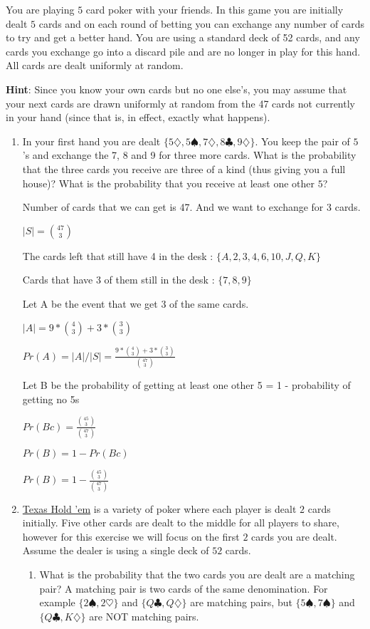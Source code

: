 \documentclass[12pt]{article}
\newcounter{ques}
\newenvironment{question}{\stepcounter{ques}{\noindent\bf Question \arabic{ques}:}}{\vspace{5mm}}
\begin{document}
\begin{question}
	You are playing $5$ card poker with your friends. In this game you are initially dealt $5$ cards and on each round of betting you can exchange any number of cards to try and get a better hand. You are using a standard deck of 52 cards, and any cards you exchange go into a discard pile and are no longer in play for this hand. All cards are dealt uniformly at random.
	
	\textbf{Hint}: Since you know your own cards but no one else's, you may assume that your next cards are drawn uniformly at random from the 47 cards not currently in your hand (since that is, in effect, exactly what happens). 
	
	\begin{enumerate}
		\item In your first hand you are dealt $\{5\diamondsuit, 5\spadesuit, 7\diamondsuit, 8\clubsuit, 9\diamondsuit \}$. You keep the pair of $5$'s and exchange the 7, 8 and 9 for three more cards. What is the probability that the three cards you receive are three of a kind (thus giving you a full house)? What is the probability that you receive at least one other $5$?
		
		Number of cards that we can get is 47. And we want to exchange for 3 cards.

		$|S| = {47 \choose 3}$ 

		The cards left that still have 4 in the desk : $\{A,2,3,4,6,10,J,Q,K\}$

		Cards that have 3 of them still in the desk : $\{7,8,9\}$

		Let A be the event that we get 3 of the same cards.

		$|A| = 9 * {4 \choose 3} + 3 * {3 \choose 3}$

		$Pr(A) = |A| / |S| = \frac{9 * {4 \choose 3} + 3 * {3 \choose 3}}{{47 \choose 3}}$

		Let B be the probability of getting at least one other 5 = 1 - probability of getting no 5s

		$Pr(Bc) = \frac{{45 \choose 3}}{{47 \choose 3}}$

		$Pr(B) = 1 - Pr(Bc)$

		$Pr(B) = 1 - \frac{{45 \choose 3}}{{47 \choose 3}}$
 
 		\item \href{https://en.wikipedia.org/wiki/Texas_hold_\%27em}{Texas Hold 'em} is a variety of poker where each player is dealt $2$ cards initially. Five other cards are dealt to the middle for all players to share, however for this exercise we will focus on the first $2$ cards you are dealt. Assume the dealer is using a single deck of $52$ cards. 
 		\begin{enumerate}
 			\item What is the probability that the two cards you are dealt are a matching pair? A matching pair is two cards of the same denomination. For example $\{2\spadesuit, 2\heartsuit\}$ and $\{Q\clubsuit, Q\diamondsuit\}$ are matching pairs, but $\{5\spadesuit, 7\spadesuit\}$ and $\{Q\clubsuit, K\diamondsuit\}$ are NOT matching pairs.


\end{enumerate}
\end{enumerate}
\end{question}
\end{document}
